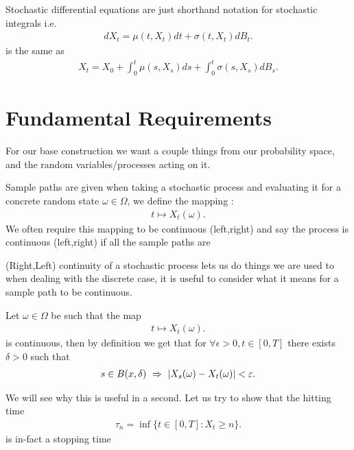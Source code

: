 \begin{Definition}[Notation]
   Stochastic differential equations are just shorthand notation for stochastic integrals  i.e.
  \begin{align*}
   dX_t = \mu(t,X_t)dt + \sigma(t,X_t)dB_t 
  .\end{align*}
  is the same as 
  \begin{align*}
    X_t = X_{0} + \int_0^{t} \mu(s,X_s) ds + \int_0^{t} \sigma(s,X_s) dB_s 
  .\end{align*}
\end{Definition}
\section{Fundamental Requirements }
For our base construction we want a couple things from our probability space, and the random variables/processes acting on it.
\begin{Definition}
  Sample paths are given when taking a stochastic process and evaluating it for a concrete random state $\omega  \in  \Omega $,
  we define the mapping : 
  \begin{align*}
    t \mapsto X_t(\omega )
  .\end{align*}
  We often require this mapping to be continuous (left,right) and say the process is continuous (left,right) if all the sample paths are
\end{Definition}
  (Right,Left)  continuity  of a stochastic process lets us do things we are used to when dealing with the discrete case, it is useful to consider what it means 
  for a sample path to be continuous.\\[1ex]
  \begin{remark}
  Let $\omega  \in  \Omega $ be such that  the map 
  \begin{align*}
    t \mapsto X_t(\omega )
  .\end{align*}
  is continuous, then by definition we get that for $\forall  \epsilon  > 0 , t \in  [0,T]$ there exists $\delta  > 0 $ such that 
  \begin{align*}
    s \in B(x,\delta ) \ \Rightarrow \  \lvert X_s(\omega ) - X_t(\omega )\rvert < \varepsilon 
  .\end{align*}
  \end{remark}
  We will see why this is useful in a second. Let us try to show that the hitting time 
  \begin{align*}
    \tau_n = \inf \{t \in  [0,T] : X_t \ge n\}  
  .\end{align*}
  is in-fact a stopping time 
